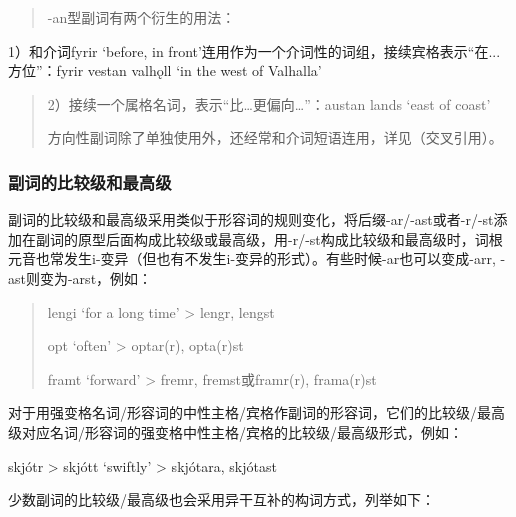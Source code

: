\begin{quote}
-an型副词有两个衍生的用法：
\end{quote}

1）和介词fyrir `before, in
front‌'连用作为一个介词性的词组，接续宾格表示``在...方位''：fyrir vestan
valhǫll `in the west of Valhalla'

\begin{quote}
2）接续一个属格名词，表示``比\ldots 更偏向\ldots''：austan lands `east
of coast‌'

方向性副词除了单独使用外，还经常和介词短语连用，详见（交叉引用）。
\end{quote}

\subsubsection{副词的比较级和最高级}\label{ux526fux8bcdux7684ux6bd4ux8f83ux7ea7ux548cux6700ux9ad8ux7ea7}

副词的比较级和最高级采用类似于形容词的规则变化，将后缀-ar/-ast或者-r/-st添加在副词的原型后面构成比较级或最高级，用-r/-st构成比较级和最高级时，词根元音也常发生i-变异（但也有不发生i-变异的形式）。有些时候-ar也可以变成-arr,
-ast则变为-arst，例如：

\begin{quote}
lengi `for a long time' \textgreater{} lengr, lengst

opt `often' \textgreater{} optar(r), opta(r)st

framt `forward' \textgreater{} fremr, fremst或framr(r), frama(r)st
\end{quote}

对于用强变格名词/形容词的中性主格/宾格作副词的形容词，它们的比较级/最高级对应名词/形容词的强变格中性主格/宾格的比较级/最高级形式，例如：

skjótr \textgreater{} skjótt `swiftly' \textgreater{} skjótara, skjótast

少数副词的比较级/最高级也会采用异干互补的构词方式，列举如下：

